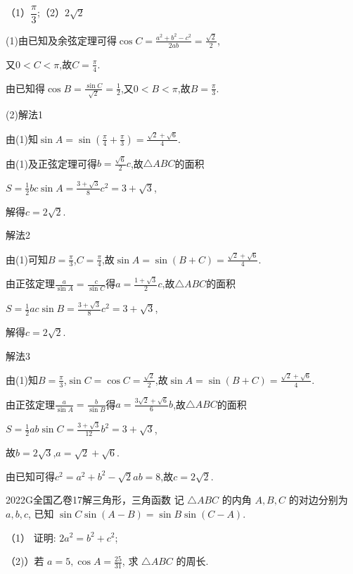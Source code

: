 \documentclass[12pt,UTF-8,a4paper]{ctexart}
\numberwithin{figure}{section}
\theoremstyle{mystyle}
\theoremstyle{mystylekaishu}
\theoremstyle{mystyle}
\numberwithin{xiti}{section}
\begin{document}
\begin{answer}
（1）$\dfrac{\pi}{3}$;（2）$2\sqrt{2}$
\end{answer}

\begin{solutions}
(1)由已知及余弦定理可得$\cos C=\frac{a^{2}+b^{2}-c^{2}}{2ab}=\frac{\sqrt{2}}{2}$,

又$0<C<\pi$,故$C=\frac{\pi}{4}$.

由已知得$\cos B=\frac{\sin C}{\sqrt{2}}=\frac{1}{2}$,又$0<B<\pi$,故$B=\frac{\pi}{3}$.

(2)解法1

由(1)知$\sin A=\sin\left(\frac{\pi}{4}+\frac{\pi}{3}\right)=\frac{\sqrt{2}+\sqrt{6}}{4}$.

由(1)及正弦定理可得$b=\frac{\sqrt{6}}{2}c$,故$\triangle ABC$的面积

$S=\frac{1}{2}bc\sin A=\frac{3+\sqrt{3}}{8}c^{2}=3+\sqrt{3}$,

解得$c=2\sqrt{2}$.

解法2

由(1)可知$B=\frac{\pi}{3}$,$C=\frac{\pi}{4}$,故$\sin A=\sin(B+C)=\frac{\sqrt{2}+\sqrt{6}}{4}$.

由正弦定理$\frac{a}{\sin A}=\frac{c}{\sin C}$得$a=\frac{1+\sqrt{3}}{2}c$,故$\triangle ABC$的面积

$S=\frac{1}{2}ac\sin B=\frac{3+\sqrt{3}}{8}c^{2}=3+\sqrt{3}$,

解得$c=2\sqrt{2}$.

解法3

由(1)知$B=\frac{\pi}{3}$,$\sin C=\cos C=\frac{\sqrt{2}}{2}$,故$\sin A=\sin(B+C)=\frac{\sqrt{2}+\sqrt{6}}{4}$.

由正弦定理$\frac{a}{\sin A}=\frac{b}{\sin B}$得$a=\frac{3\sqrt{2}+\sqrt{6}}{6}b$,故$\triangle ABC$的面积

$S=\frac{1}{2}ab\sin C=\frac{3+\sqrt{3}}{12}b^{2}=3+\sqrt{3}$,

故$b=2\sqrt{3}$,$a=\sqrt{2}+\sqrt{6}$.

由已知可得$c^{2}=a^{2}+b^{2}-\sqrt{2}ab=8$,故$c=2\sqrt{2}$.
\end{solutions}


\begin{problem}{2022}{G}{全国乙卷}{17}{解三角形，三角函数}
记 $\triangle ABC$ 的内角 $A,B,C$ 的对边分别为 $a,b,c$, 已知 $\sin C\sin(A-B)=\sin B\sin(C-A)$.

（1） 证明: $2a^2=b^2+c^2$;

（2)）若 $a=5, \cos A=\frac{25}{31}$, 求 $\triangle ABC$ 的周长.
\end{problem}
\end{document}
